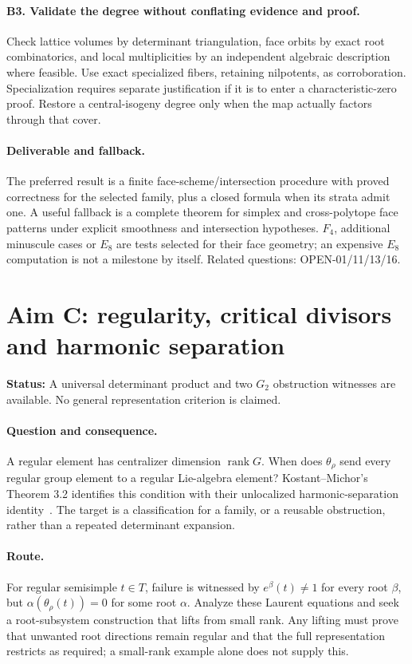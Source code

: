 \documentclass[11pt,letterpaper]{article}
\newcommand{\status}[1]{\noindent\textbf{Status:} #1\par}
\begin{document}
\paragraph{B3. Validate the degree without conflating evidence and proof.}
Check lattice volumes by determinant triangulation, face orbits by exact
root combinatorics, and local multiplicities by an independent algebraic
description where feasible. Use exact specialized fibers, retaining
nilpotents, as corroboration. Specialization requires separate justification
if it is to enter a characteristic-zero proof. Restore a central-isogeny
degree only when the map actually factors through that cover.

\paragraph{Deliverable and fallback.}
The preferred result is a finite face-scheme/intersection procedure with
proved correctness for the selected family, plus a closed formula when its
strata admit one. A useful fallback is a complete theorem for simplex and
cross-polytope face patterns under explicit smoothness and intersection
hypotheses. \(F_4\), additional minuscule cases or \(E_8\) are tests selected
for their face geometry; an expensive \(E_8\) computation is not a milestone
by itself. Related questions: OPEN-01/11/13/16.

\newpage
\section{Aim C: regularity, critical divisors and harmonic separation}
\status{A universal determinant product and two \(G_2\) obstruction witnesses
are available. No general representation criterion is claimed.}

\paragraph{Question and consequence.}
A regular element has centralizer dimension \(\operatorname{rank}G\).
When does \(\theta_\rho\) send every regular group element to a regular
Lie-algebra element? Kostant--Michor's Theorem 3.2 identifies this condition
with their unlocalized harmonic-separation identity~\cite{KM}.
The target is a classification for a family, or a reusable obstruction,
rather than a repeated determinant expansion.

\paragraph{Route.}
For regular semisimple \(t\in T\), failure is witnessed by
\(e^\beta(t)\ne1\) for every root \(\beta\), but
\(\alpha(\theta_\rho(t))=0\) for some root \(\alpha\).
Analyze these Laurent equations and seek a root-subsystem construction
that lifts from small rank. Any lifting must prove that unwanted
root directions remain regular and that the full representation restricts
as required; a small-rank example alone does not supply this.
\end{document}
